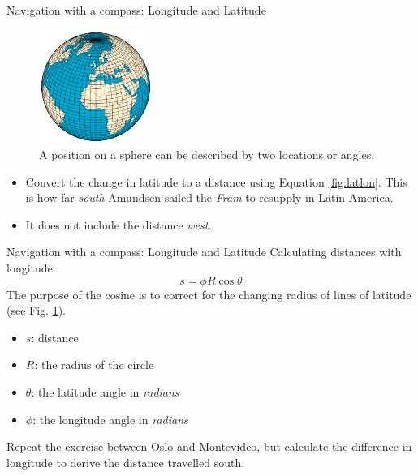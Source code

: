 \documentclass{beamer}
\begin{document}
\begin{frame}{Navigation with a compass: Longitude and Latitude}
\begin{figure}
\centering
\includegraphics[width=0.33\textwidth]{latlon2.png}
\caption{\label{fig:latlon3} A position on a sphere can be described by two locations or angles.}
\end{figure}
\begin{itemize}
\item Convert the change in latitude to a distance using Equation \ref{fig:latlon}. This is how far \textit{south} Amundsen sailed the \textit{Fram} to resupply in Latin America.
\item It does not include the distance \textit{west.}
\end{itemize}
\end{frame}

\begin{frame}{Navigation with a compass: Longitude and Latitude}
Calculating distances with longitude:
\begin{equation}
s = \phi R \cos\theta \label{eq:latlon2}
\end{equation}
The purpose of the cosine is to correct for the changing radius of lines of latitude (see Fig. \ref{fig:latlon3}).
\begin{itemize}
\item $s$: distance
\item $R$: the radius of the circle
\item $\theta$: the latitude angle in \textit{radians}
\item $\phi$: the longitude angle in \textit{radians}
\end{itemize}
Repeat the exercise between Oslo and Montevideo, but calculate the difference in longitude to derive the distance travelled south.
\end{frame}
\end{document}
